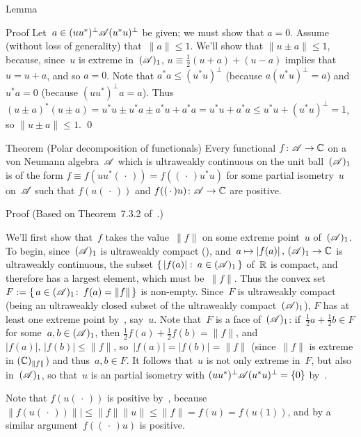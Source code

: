 \documentclass[a]{subfiles}
\begin{document}
\begin{parsec}
\begin{point}{Lemma}
\begin{point}{Proof}
Let~$a\in (uu^*)^\perp \mathscr{A} (u^*u)^\perp$
be given; we must show that $a=0$.
Assume (without loss of generality)
that~$\|a\|\leq 1$.
We'll show that $\|u\pm a\|\leq 1$,
because,
since~$u$ is extreme in~$(\mathscr{A})_1$,
$u\equiv \frac{1}{2}(u+a)+(u-a)$
implies that~$u=u+a$, and so $a=0$.
Note that $a^*a \leq (u^*u)^\perp$ (because $a(u^*u)^\perp=a$)
and $u^*a = 0$ (because $(uu^*)^\perp a=a$).
Thus $(u\pm a)^*(u\pm a)
=u^*u \pm u^* a \pm a^* u + a^*a
= u^*u + a^*a \leq u^*u + (u^*u)^\perp = 1$,
so $\|u\pm a\|\leq 1$. \qed
\end{point}
\end{point}
\begin{point}%
	{Theorem (Polar decomposition of functionals)}%
Every functional $f\colon \mathscr{A}\to \mathbb{C}$ on a von Neumann algebra~$\mathscr{A}$
which is ultraweakly continuous on
the unit ball~$(\mathscr{A})_1$
is of the form $f\equiv f(uu^*(\,\cdot\,)) = f((\,\cdot\,)u^*u)$
for some partial isometry~$u$ on~$\mathscr{A}$
such that $f(u(\,\cdot\,))$
and $f((\,\cdot\,)u)\colon \mathscr{A}\to\mathbb{C}$
are positive.
\begin{point}{Proof}%
(Based on Theorem~7.3.2 of~\cite{kr}.) 
\begin{point}%
We'll first show that~$f$ takes the value~$\|f\|$
on some extreme point~$u$ of~$(\mathscr{A})_1$.
To begin, since~$(\mathscr{A})_1$ is ultraweakly compact (),
and~$a\mapsto \left|f(a)\right|,\,(\mathscr{A})_1\to\mathbb{C}$ 
is ultraweakly continuous,
the subset $\{\,\left|f(a)\right|\colon\,a\in(\mathscr{A})_1\,\}$
of~$\mathbb{R}$ is compact,
and therefore has a largest element, 
which must be~$\|f\|$.
Thus the convex
set~$F:=\{\,a\in(\mathscr{A})_1\colon\, f(a)=\|f\|\,\}$
is non-empty.
Since~$F$ is ultraweakly compact (being an ultraweakly closed
subset of the ultraweakly compact~$(\mathscr{A})_1$),
$F$ has at least one extreme point
by~, say~$u$.
Note that~$F$ is a face of~$(\mathscr{A})_1$:
if~$\frac{1}{2}a+\frac{1}{2}b\in F$ for some~$a,b\in(\mathscr{A})_1$,
then $\frac{1}{2}f(a)+\frac{1}{2}f(b) = \|f\|$,
and $\left|f(a)\right|,\,\left|f(b)\right|\leq \|f\|$,
so~$\left|f(a)\right|=\left|f(b)\right|=\|f\|$
(since~$\|f\|$ is extreme in $(\mathbb{C})_{\|f\|}$)
and thus~$a,b\in F$.
It follows that~$u$ is not only extreme in~$F$, but also in~$(\mathscr{A})_1$,
so that~$u$ is an partial isometry with $(uu^*)^\perp\mathscr{A}(u^*u)^\perp=\{0\}$
by~.

Note that $f(u(\,\cdot\,))$
is positive by~, because
$\|f(u(\,\cdot\,))\||\leq\|f\|\|u\|\leq\|f\|=f(u)=f(u(1))$,
and by a similar argument~$f((\,\cdot\,)u)$
is positive.


\end{point}
\end{point}
\end{point}
\end{parsec}
\end{document}
